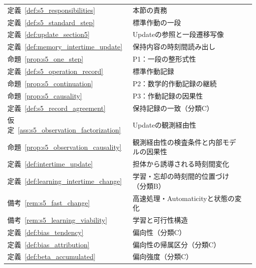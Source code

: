 \begingroup
\small
\setlength{\tabcolsep}{4pt}
\renewcommand{\arraystretch}{1.12}
\begin{longtable}{p{2.4cm} p{10.4cm} r}
定義~\ref{def:s5_responsibilities} & 本節の責務 & \pageref{def:s5_responsibilities} \\
定義~\ref{def:s5_standard_step} & 標準作動の一段 & \pageref{def:s5_standard_step} \\
定義~\ref{def:update_section5} & Updateの参照と一段遷移写像 & \pageref{def:update_section5} \\
定義~\ref{def:memory_intertime_update} & 保持内容の時刻間読み出し & \pageref{def:memory_intertime_update} \\
命題~\ref{prop:s5_one_step} & P1：一段の整形式性 & \pageref{prop:s5_one_step} \\
定義~\ref{def:s5_operation_record} & 標準作動記録 & \pageref{def:s5_operation_record} \\
命題~\ref{prop:s5_continuation} & P2：数学的作動記録の継続 & \pageref{prop:s5_continuation} \\
命題~\ref{prop:s5_causality} & P3：作動記録の因果性 & \pageref{prop:s5_causality} \\
定義~\ref{def:s5_record_agreement} & 保持記録の一致（分類C） & \pageref{def:s5_record_agreement} \\
仮定~\ref{ass:s5_observation_factorization} & Updateの観測経由性 & \pageref{ass:s5_observation_factorization} \\
命題~\ref{prop:s5_observation_causality} & 観測経由性の検査条件と内部モデルの因果性 & \pageref{prop:s5_observation_causality} \\
定義~\ref{def:intertime_update} & 担体から誘導される時刻間変化 & \pageref{def:intertime_update} \\
定義~\ref{def:learning_intertime_change} & 学習・忘却の時刻間的位置づけ（分類B） & \pageref{def:learning_intertime_change} \\
備考~\ref{rem:s5_fast_change} & 高速処理・Automaticityと状態の変化 & \pageref{rem:s5_fast_change} \\
備考~\ref{rem:s5_learning_viability} & 学習と可行性構造 & \pageref{rem:s5_learning_viability} \\
定義~\ref{def:bias_tendency} & 偏向性（分類C） & \pageref{def:bias_tendency} \\
定義~\ref{def:bias_attribution} & 偏向性の帰属区分（分類C） & \pageref{def:bias_attribution} \\
定義~\ref{def:beta_accumulated} & 偏向強度（分類C） & \pageref{def:beta_accumulated} \\

\end{longtable}
